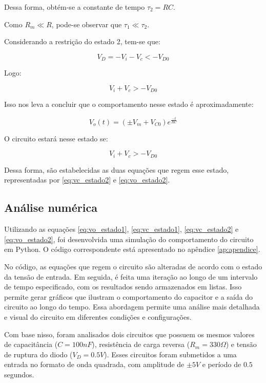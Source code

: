 Dessa forma, obtém-se a constante de tempo $\tau_2 = R C$.

Como $R_m \ll R$, pode-se observar que $\tau_1 \ll \tau_2$.

Considerando a restrição do estado 2, tem-se que:

\begin{equation}
    V_D = -V_i - V_c < - V_{D0}
\end{equation}

Logo:

\begin{equation}
    V_i + V_c > - V_{D0}
\end{equation}

Isso nos leva a concluir que o comportamento nesse estado é aproximadamente:

\begin{equation}
    \label{eq:vo_estado2}
    V_o(t) = (\pm V_m + V_{C0}) e^{\frac{-t}{R C}}
\end{equation}

O circuito estará nesse estado se:

\begin{equation}
    V_i + V_c > - V_{D0}
\end{equation}

Dessa forma, são estabelecidas as duas equações que regem esse estado, representadas por \ref{eq:vc_estado2} e \ref{eq:vo_estado2}.

\subsection{Análise numérica}

Utilizando as equações \ref{eq:vo_estado1}, \ref{eq:vc_estado1}, \ref{eq:vc_estado2} e \ref{eq:vo_estado2}, foi desenvolvida uma simulação do comportamento do circuito em Python. O código correspondente está apresentado no apêndice \ref{ap:apendice}.

No código, as equações que regem o circuito são alteradas de acordo com o estado da tensão de entrada. Em seguida, é feita uma iteração ao longo de um intervalo de tempo especificado, com os resultados sendo armazenados em listas. Isso permite gerar gráficos que ilustram o comportamento do capacitor e a saída do circuito ao longo do tempo. Essa abordagem permite uma análise mais detalhada e visual do circuito em diferentes condições e configurações.

Com base nisso, foram analisados dois circuitos que possuem os mesmos valores de capacitância ($C = 100 nF$), resistência de carga reversa ($R_m = 330 \Omega$) e tensão de ruptura do diodo ($V_D = 0.5V$). Esses circuitos foram submetidos a uma entrada no formato de onda quadrada, com amplitude de $\pm 5 V$ e período de $0.5$ segundos.

